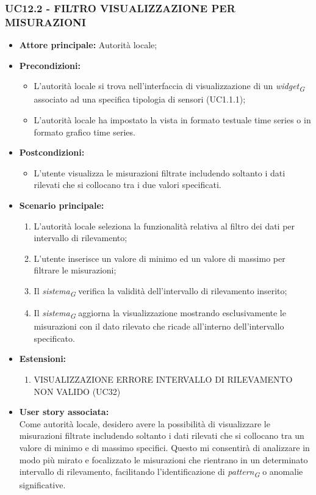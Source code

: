 \subsubsection{UC12.2 - FILTRO VISUALIZZAZIONE PER MISURAZIONI}
\begin{itemize}
    \item \textbf{Attore principale:} Autorità locale;
    \item \textbf{Precondizioni:}
        \begin{itemize}
            \item L'autorità locale si trova nell'interfaccia di visualizzazione di un \textit{widget}\textsubscript{\textit{G}} associato ad una specifica tipologia di sensori (UC1.1.1);
            \item L'autorità locale ha impostato la vista in formato testuale time series o in formato grafico time series.
        \end{itemize}
    \item \textbf{Postcondizioni:}
        \begin{itemize}
            \item L'utente visualizza le misurazioni filtrate includendo soltanto i dati rilevati che si collocano tra i due valori specificati.
        \end{itemize}
    \item \textbf{Scenario principale:}
        \begin{enumerate}
            \item L'autorità locale seleziona la funzionalità relativa al filtro dei dati per intervallo di rilevamento;
            \item L'utente inserisce un valore di minimo ed un valore di massimo per filtrare le misurazioni;
            \item Il \textit{sistema}\textsubscript{\textit{G}} verifica la validità dell'intervallo di rilevamento inserito;
            \item Il \textit{sistema}\textsubscript{\textit{G}} aggiorna la visualizzazione mostrando esclusivamente le misurazioni con il dato rilevato che ricade all'interno dell'intervallo specificato.
        \end{enumerate}
    \vspace{0,5cm}
    \item \textbf{Estensioni:}
        \begin{enumerate}
            \item VISUALIZZAZIONE ERRORE INTERVALLO DI RILEVAMENTO NON VALIDO (UC32)
        \end{enumerate}
    \item \textbf{User story associata:} \\
        Come autorità locale, desidero avere la possibilità di visualizzare le misurazioni filtrate includendo soltanto i dati rilevati che si collocano tra un valore di minimo e di massimo specifici. Questo mi consentirà di analizzare in modo più mirato e focalizzato le misurazioni che rientrano in un determinato intervallo di rilevamento, facilitando l'identificazione di \textit{pattern}\textsubscript{\textit{G}} o anomalie significative.
\end{itemize}
